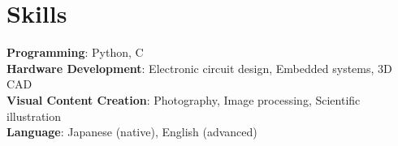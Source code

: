 \documentclass[letterpaper,11pt]{article}
\begin{document}
\section{Skills}
\small{
    \textbf{Programming}: Python, {C\nolinebreak[4]\hspace{-.05em}\raisebox{.4ex}{\tiny\bf ++}} \\
    \textbf{Hardware Development}: Electronic circuit design, Embedded systems, 3D CAD \\
    \textbf{Visual Content Creation}: Photography, Image processing, Scientific illustration \\
    \textbf{Language}: Japanese (native), English (advanced)
}


\end{document}
